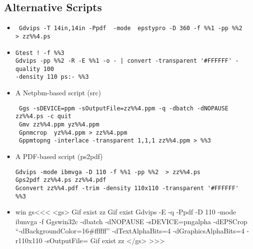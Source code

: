 \documentclass{article}
\begin{document}
\subsection{Alternative Scripts}






\begin{itemize}
\item
\begin{verbatim}
 Gdvips -T 14in,14in -Ppdf  -mode  epstypro -D 360 -f %%1 -pp %%2  > zz%%4.ps
\end{verbatim}

\item
\begin{verbatim}
Gtest ! -f %%3  
Gdvips -pp %%2 -R -E %%1 -o - | convert -transparent '#FFFFFF' -quality 100   
-density 110 ps:- %%3  
\end{verbatim}

\item
{A 
Netpbm-based script
(src\EndLink{})}

\begin{verbatim}
 Ggs -sDEVICE=ppm -sOutputFile=zz%%4.ppm -q -dbatch -dNOPAUSE zz%%4.ps -c quit
 Gmv zz%%4.ppm yz%%4.ppm
 Gpnmcrop  yz%%4.ppm > zz%%4.ppm
 Gppmtopng -interlace -transparent 1,1,1 zz%%4.ppm > %%3
\end{verbatim}

\item
{A 
PDF-based script
(ps2pdf\EndLink{})}
\begin{verbatim}
Gdvips -mode ibmvga -D 110 -f %%1 -pp %%2  > zz%%4.ps
Gps2pdf zz%%4.ps zz%%4.pdf
Gconvert zz%%4.pdf -trim -density 110x110 -transparent '#FFFFFF' %%3
\end{verbatim}


\item

\<win gs\><<<
<gs>
Gif exist zz%
Gif exist %
Gdvips -E -q -Ppdf -D 110 -mode ibmvga -f %
Ggswin32c -dbatch -dNOPAUSE -sDEVICE=pngalpha -dEPSCrop ``-dBackgroundColor=16#ffffff'' -dTextAlphaBits=4 -dGraphicsAlphaBits=4 -r110x110 -sOutputFile=%
Gif exist zz%
</gs>
>>>


\end{itemize}
\end{document}
